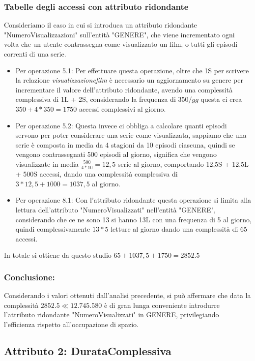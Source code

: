 \documentclass[a4paper,12pt]{report}
\begin{document}
\subsubsection{Tabelle degli accessi con attributo ridondante}
Consideriamo il caso in cui si introduca un attributo ridondante "NumeroVisualizzazioni" sull'entità "GENERE", che viene incrementato ogni volta che un utente contrassegna come visualizzato un film, o tutti gli episodi correnti di una serie.
\begin{itemize}
	\item Per operazione 5.1: Per effettuare questa operazione, oltre che 1S per scrivere la relazione \textit{visualizzazionefilm} è necessario un aggiornamento su genere per incrementare il valore dell'attributo ridondante, avendo una complessità complessiva di 1L + 2S, considerando la frequenza di $350/gg$ questa ci crea $350 + 4 * 350 = 1750$ accessi complessivi al giorno.
	\item Per operazione 5.2: Questa invece ci obbliga a calcolare quanti episodi servono per poter considerare una serie come visualizzata, sappiamo che una serie è composta in media da 4 stagioni da 10 episodi ciascuna, quindi se vengono contrassegnati 500 episodi al giorno, significa che vengono visualizzate in media $\frac{500}{4 * 10} = 12,5$ serie al giorno, comportando 12,5S + 12,5L + 500S accessi, dando una complessità complessiva di $3 * 12,5 + 1000 = 1037,5$ al giorno.
	\item Per operazione 8.1: Con l'attributo ridondante questa operazione si limita alla lettura dell'attributo "NumeroVisualizzati" nell'entità "GENERE", considerando che ce ne sono 13 si hanno 13L con una frequenza di 5 al giorno, quindi complessivamente $13 * 5$ letture al giorno dando una complessità di 65 accessi.
\end{itemize}
In totale si ottiene da questo studio $65 + 1037,5 + 1750 = 2852.5$
\subsubsection{Conclusione:}
Considerando i valori ottenuti dall'analisi precedente, si può affermare che data la complessità $2852.5 \ll 12.745.580$ è di gran lunga conveniente introdurre l'attributo ridondante "NumeroVisualizzati" in GENERE, privilegiando l'efficienza rispetto all'occupazione di spazio.
\subsection{Attributo 2: DurataComplessiva}
\end{document}
